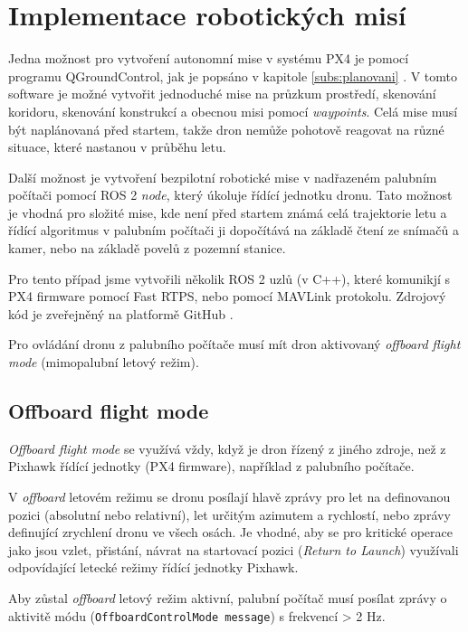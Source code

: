 \chapter{Implementace robotických misí}

Jedna možnost pro vytvoření autonomní mise v systému PX4 je pomocí programu QGroundControl, jak je popsáno v kapitole \ref{subs:planovani} . V tomto software je možné vytvořit jednoduché mise na průzkum prostředí, skenování koridoru, skenování konstrukcí a obecnou misi pomocí \textit{waypoints}. Celá mise musí být naplánovaná před startem, takže dron nemůže pohotově reagovat na různé situace, které nastanou v průběhu letu. 

Další možnost je vytvoření bezpilotní robotické mise v nadřazeném palubním počítači pomocí ROS 2 \textit{node}, který úkoluje řídící jednotku dronu. Tato možnost je vhodná pro složité mise, kde není před startem známá celá trajektorie letu a řídící algoritmus v palubním počítači ji dopočítává na základě čtení ze snímačů a kamer, nebo na základě povelů z pozemní stanice.

Pro tento případ jsme vytvořili několik ROS 2 uzlů (v C++), které komunikjí s PX4 firmware pomocí Fast RTPS, nebo pomocí MAVLink protokolu. Zdrojový kód je zveřejněný na platformě GitHub \cite{GIT}.

Pro ovládání dronu z palubního počítače musí mít dron aktivovaný \textit{offboard flight mode} (mimopalubní letový režim).

\section{Offboard flight mode}

\textit{Offboard flight mode} se využívá vždy, když je dron řízený z jiného zdroje, než z Pixhawk řídící jednotky (PX4 firmware), například z palubního počítače. 

V \textit{offboard} letovém režimu se dronu posílají hlavě zprávy pro let na definovanou pozici (absolutní nebo relativní), let určitým azimutem a rychlostí, nebo zprávy definující zrychlení dronu ve všech osách. Je vhodné, aby se pro kritické operace jako jsou vzlet, přistání, návrat na startovací pozici (\textit{Return to Launch}) využívali odpovídající letecké režimy řídící jednotky Pixhawk.

Aby zůstal \textit{offboard} letový režim aktivní, palubní počítač musí posílat zprávy o aktivitě módu (\texttt{OffboardControlMode message}) s frekvencí > 2 Hz.

